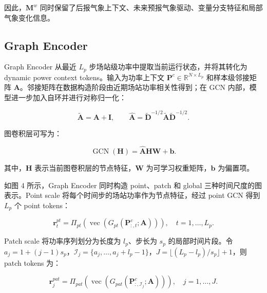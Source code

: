 因此，\(\mathbf{M}^{w}\) 同时保留了后报气象上下文、未来预报气象驱动、变量分支特征和局部气象变化信息。


\subsection{Graph Encoder}

Graph Encoder 从最近 \(L_p\) 步场站级功率中提取当前运行状态，并将其转化为 dynamic power context tokens。输入为功率上下文 \(\mathbf{P}^{c}\in\mathbb{R}^{N\times L_p}\) 和样本级邻接矩阵 \(\mathbf{A}\)。邻接矩阵在数据构造阶段由近期场站功率相关性得到；在 GCN 内部，模型进一步加入自环并进行对称归一化：

\begin{equation}
\tilde{\mathbf{A}}=\mathbf{A}+\mathbf{I},\qquad
\hat{\mathbf{A}}=\tilde{\mathbf{D}}^{-1/2}\tilde{\mathbf{A}}\tilde{\mathbf{D}}^{-1/2}.
\end{equation}

图卷积层可写为：

\begin{equation}
\operatorname{GCN}(\mathbf{H})=\hat{\mathbf{A}}\mathbf{H}\mathbf{W}+\mathbf{b}.
\end{equation}

其中，\(\mathbf{H}\) 表示当前图卷积层的节点特征，\(\mathbf{W}\) 为可学习权重矩阵，\(\mathbf{b}\) 为偏置项。

如图 4 所示，Graph Encoder 同时构造 point、patch 和 global 三种时间尺度的图表示。Point scale 将每个时间步的场站功率作为节点特征，经过 point GCN 得到 \(L_p\) 个 point tokens：

\begin{equation}
\mathbf{r}^{pt}_{t}=\Pi_{pt}\left(\operatorname{vec}\left(G_{pt}(\mathbf{P}^{c}_{:,t};\mathbf{A})\right)\right), \quad t=1,\ldots,L_p.
\end{equation}

Patch scale 将功率序列划分为长度为 \(l_p\)、步长为 \(s_p\) 的局部时间片段。令 \(a_j=1+(j-1)s_p\)，\(\mathcal{I}_j=\{a_j,\ldots,a_j+l_p-1\}\)，\(J=\lfloor(L_p-l_p)/s_p\rfloor+1\)，则 patch tokens 为：

\begin{equation}
\mathbf{r}^{pat}_{j}=\Pi_{pat}\left(\operatorname{vec}\left(G_{pat}(\mathbf{P}^{c}_{:,\mathcal{I}_j};\mathbf{A})\right)\right), \quad j=1,\ldots,J.
\end{equation}

